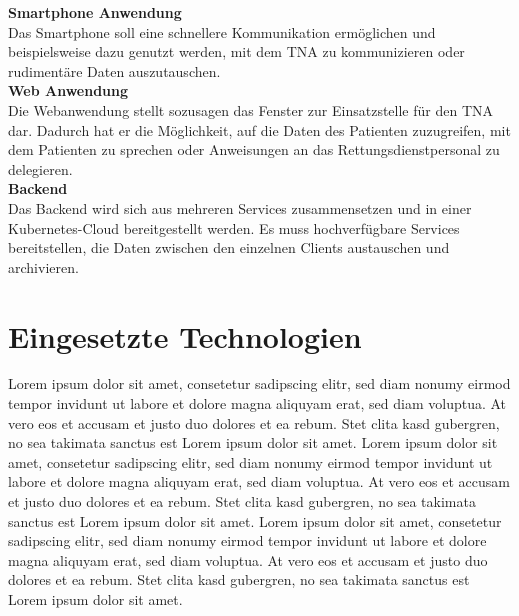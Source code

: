 \textbf{Smartphone Anwendung}\\
Das Smartphone soll eine schnellere Kommunikation ermöglichen und beispielsweise dazu genutzt werden, mit dem TNA zu kommunizieren oder rudimentäre Daten auszutauschen.\\


\textbf{Web Anwendung}\\

Die Webanwendung stellt sozusagen das Fenster zur Einsatzstelle für den TNA dar. Dadurch hat er die Möglichkeit, auf die Daten des Patienten zuzugreifen, mit dem Patienten zu sprechen oder Anweisungen an das Rettungsdienstpersonal zu delegieren.\\

\textbf{Backend}\\


Das Backend wird sich aus mehreren Services zusammensetzen und in einer Kubernetes-Cloud bereitgestellt werden. Es muss hochverfügbare Services bereitstellen, die Daten zwischen den einzelnen Clients austauschen und archivieren.\\


\section{Eingesetzte Technologien}
Lorem ipsum dolor sit amet, consetetur sadipscing elitr, sed diam nonumy eirmod tempor invidunt ut labore et dolore magna aliquyam erat, sed diam voluptua. At vero eos et accusam et justo duo dolores et ea rebum. Stet clita kasd gubergren, no sea takimata sanctus est Lorem ipsum dolor sit amet. Lorem ipsum dolor sit amet, consetetur sadipscing elitr, sed diam nonumy eirmod tempor invidunt ut labore et dolore magna aliquyam erat, sed diam voluptua. At vero eos et accusam et justo duo dolores et ea rebum. Stet clita kasd gubergren, no sea takimata sanctus est Lorem ipsum dolor sit amet. Lorem ipsum dolor sit amet, consetetur sadipscing elitr, sed diam nonumy eirmod tempor invidunt ut labore et dolore magna aliquyam erat, sed diam voluptua. At vero eos et accusam et justo duo dolores et ea rebum. Stet clita kasd gubergren, no sea takimata sanctus est Lorem ipsum dolor sit amet.

